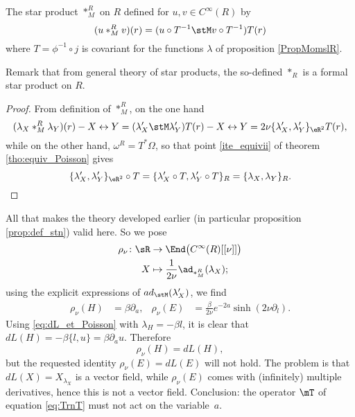 \begin{corollary}
The star product $\ast_M^R$ on $R$ defined for $u,v\in C^{\infty}(R)$ by
\begin{equation}
  (u\ast_M^R v)(r)=( u\circ T^{-1}\stM v\circ T^{-1} )T(r)
\end{equation}
where $T=\phi^{-1}\circ j$ is covariant for the functions $\lambda$ of proposition \ref{PropMomslR}.

\end{corollary}
Remark that from general theory of star products, the so-defined $\ast_R$ is a formal star product on $R$.

\begin{proof}
From definition of $\ast_M^R$, on the one hand
\[ 
  (\lambda_X\ast_M^R \lambda_Y)(r)-X\leftrightarrow Y=(\lambda'_X\stM\lambda'_Y)T(r)-X\leftrightarrow Y
=2\nu\{  \lambda'_X,\lambda'_Y \}_{\eR^2}T(r),
\]
while on the other hand, $\omega^R=T^*\Omega$, so that point \ref{ite_equivii} of theorem \ref{tho:equiv_Poisson}  gives
\[ 
  \{ \lambda'_X,\lambda'_Y \}_{\eR^2}\circ T=\{ \lambda'_X\circ T,\lambda'_Y\circ T \}_R=\{ \lambda_X,\lambda_Y \}_R.
\]

\end{proof}

All that makes the theory developed earlier (in particular proposition \ref{prop:def_stn}) valid here. So we pose
\begin{equation}
\begin{aligned}
 {\rho_{\nu}}\colon\sR &\to {\End\big(  C^{\infty}(R)[ [\nu]] \big)} \\ 
  X &\mapsto {\frac{1}{2\nu}\ad_{\ast_M^R}(\lambda_X);} 
\end{aligned}
\end{equation}
using the explicit expressions of $ad_{\stM}(\lambda'_X)$, we find
\begin{align}
  \rho_{\nu}(H)&=\beta\partial_a,	&\rho_{\nu}(E)&=\frac{\beta}{2\nu}e^{-2a}\sinh(2\nu\partial_l).
\end{align}
Using \eqref{eq:dL_et_Poisson} with $\lambda_H=-\beta l$, it is clear that $dL(H)=-\beta\{l,u\}=\beta\partial_a u$. Therefore
\begin{equation}
   \rho_{\nu}(H)=dL(H),
\end{equation}
but the requested identity $\rho_{\nu}(E)=dL(E)$ will not hold. The problem is that $dL(X)=X_{\lambda_X}$ is a vector field, while $\rho_{\nu}(E)$ comes with (infinitely) multiple derivatives, hence this is not a vector field. Conclusion: the operator $\mT$ of equation \eqref{eq:TrnT} must not act on the variable~$a$.

